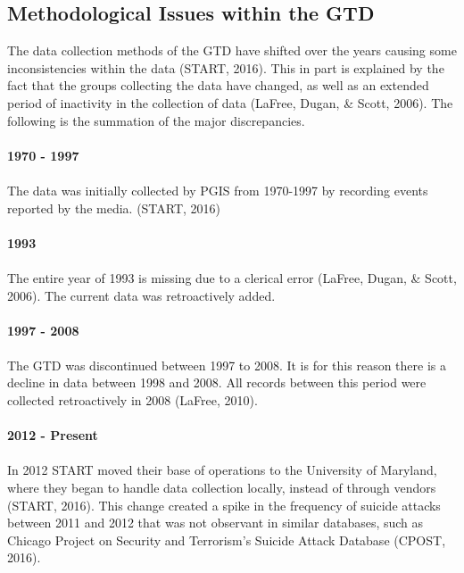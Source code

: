 \documentclass[10pt,a4paper]{article}
\begin{document}
\subsection{Methodological Issues within the GTD}

The data collection methods of the GTD have shifted over the years causing some inconsistencies within the data (START, 2016). This in part is explained by the fact that the groups collecting the data have changed, as well as an extended period of inactivity in the collection of data (LaFree, Dugan, \& Scott, 2006). The following is the summation of the major discrepancies.
\\\\

\textbf{1970 - 1997 }\\\\
The data was initially collected by PGIS from 1970-1997 by recording events reported by the media. (START, 2016)\\\\

\textbf{1993}\\\\
The entire year of 1993 is missing due to a clerical error (LaFree, Dugan, \& Scott, 2006). The current data was retroactively added.
\\\\

\textbf{1997 - 2008}\\\\
The GTD was discontinued between 1997 to 2008. It is for this reason there is a decline in data between 1998 and 2008. All records between this period were collected retroactively in 2008 (LaFree, 2010).
\\\\

\textbf{2012 - Present}\\\\
In 2012 START moved their base of operations to the University of Maryland, where they began to handle data collection locally, instead of through vendors (START, 2016). This change created a spike in the frequency of suicide attacks between 2011 and 2012 that was not observant in similar databases, such as Chicago Project on Security and Terrorism’s Suicide Attack Database (CPOST, 2016).
\\\\
\end{document}
